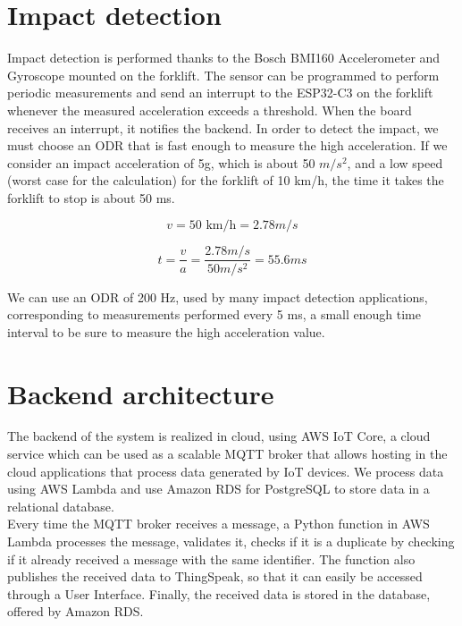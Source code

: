 \section{Impact detection}
Impact detection is performed thanks to the Bosch BMI160 Accelerometer and Gyroscope mounted on the forklift. The sensor can be programmed to perform periodic measurements and send an interrupt to the ESP32-C3 on the forklift whenever the measured acceleration exceeds a threshold. When the board receives an interrupt, it notifies the backend. In order to detect the impact, we must choose an ODR that is fast enough to measure the high acceleration.  If we consider an impact acceleration of 5g, which is about 50 $m/s^2$, and a low  speed (worst case for the calculation) for the forklift of 10 km/h, the time it takes the forklift to stop is about 50 ms.

\begin{equation}
v = 50 \text{ km/h} = 2.78 m/s
\end{equation}

\begin{equation}
t = \frac{v}{a} = \frac{2.78 m/s}{50 m/s^2} = 55.6 ms
\end{equation}

We can use an ODR of 200 Hz, used by many impact detection applications, corresponding to measurements performed every 5 ms, a small enough time interval to be sure to measure the high acceleration value.

\section{Backend architecture}
The backend of the system is realized in cloud, using AWS IoT Core, a cloud service which can be used as a scalable MQTT broker that allows hosting in the cloud applications that process data generated by IoT devices. We process data using AWS Lambda and use Amazon RDS for PostgreSQL to store data in a relational database.\\
Every time the MQTT broker receives a message, a Python function in AWS Lambda processes the message, validates it, checks if it is a duplicate by checking if it already received a message with the same identifier. The function also publishes the received data to ThingSpeak, so that it can easily be accessed through a User Interface. Finally, the received data is stored in the database, offered by Amazon RDS.


\pagebreak
